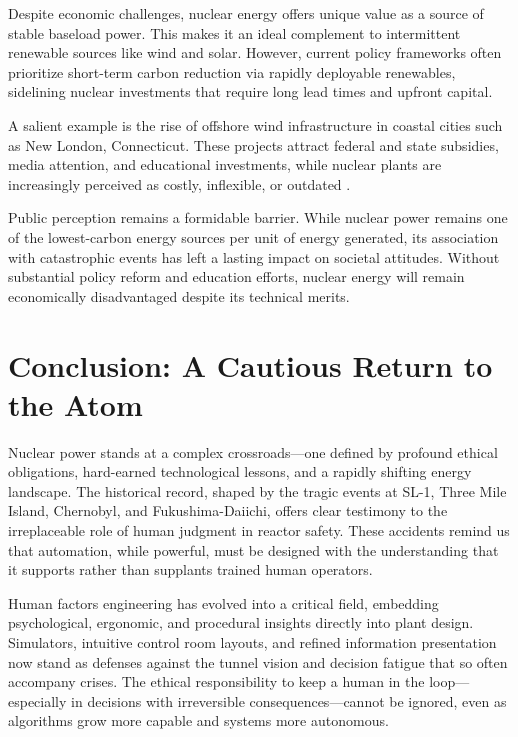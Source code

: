 \documentclass[12pt]{article}
\begin{document}
Despite economic challenges, nuclear energy offers unique value as a source of stable baseload power. This makes it an ideal complement to intermittent renewable sources like wind and solar. However, current policy frameworks often prioritize short-term carbon reduction via rapidly deployable renewables, sidelining nuclear investments that require long lead times and upfront capital.

A salient example is the rise of offshore wind infrastructure in coastal cities such as New London, Connecticut. These projects attract federal and state subsidies, media attention, and educational investments, while nuclear plants are increasingly perceived as costly, inflexible, or outdated \autocite{abdussami2025future}.

Public perception remains a formidable barrier. While nuclear power remains one of the lowest-carbon energy sources per unit of energy generated, its association with catastrophic events has left a lasting impact on societal attitudes. Without substantial policy reform and education efforts, nuclear energy will remain economically disadvantaged despite its technical merits.

\section{Conclusion: A Cautious Return to the Atom}

Nuclear power stands at a complex crossroads—one defined by profound ethical obligations, hard-earned technological lessons, and a rapidly shifting energy landscape. The historical record, shaped by the tragic events at SL-1, Three Mile Island, Chernobyl, and Fukushima-Daiichi, offers clear testimony to the irreplaceable role of human judgment in reactor safety. These accidents remind us that automation, while powerful, must be designed with the understanding that it supports rather than supplants trained human operators.

Human factors engineering has evolved into a critical field, embedding psychological, ergonomic, and procedural insights directly into plant design. Simulators, intuitive control room layouts, and refined information presentation now stand as defenses against the tunnel vision and decision fatigue that so often accompany crises. The ethical responsibility to keep a human in the loop—especially in decisions with irreversible consequences—cannot be ignored, even as algorithms grow more capable and systems more autonomous.
\end{document}
